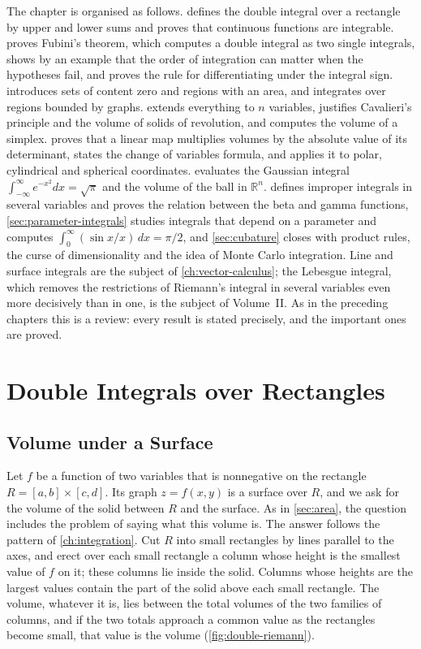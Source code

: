 The chapter is organised as follows.  defines the double integral over a rectangle by upper and lower sums and proves that continuous functions are integrable.  proves Fubini's theorem, which computes a double integral as two single integrals, shows by an example that the order of integration can matter when the hypotheses fail, and proves the rule for differentiating under the integral sign.  introduces sets of content zero and regions with an area, and integrates over regions bounded by graphs.  extends everything to $n$ variables, justifies Cavalieri's principle and the volume of solids of revolution, and computes the volume of a simplex.  proves that a linear map multiplies volumes by the absolute value of its determinant, states the change of variables formula, and applies it to polar, cylindrical and spherical coordinates.  evaluates the Gaussian integral $\int_{-\infty}^\infty e^{-x^2}dx=\sqrt\pi$ and the volume of the ball in $\mathbb R^n$.  defines improper integrals in several variables and proves the relation between the beta and gamma functions, \cref{sec:parameter-integrals} studies integrals that depend on a parameter and computes $\int_0^\infty(\sin x/x)\,dx=\pi/2$, and \cref{sec:cubature} closes with product rules, the curse of dimensionality and the idea of Monte Carlo integration. Line and surface integrals are the subject of \cref{ch:vector-calculus}; the Lebesgue integral, which removes the restrictions of Riemann's integral in several variables even more decisively than in one, is the subject of Volume~II. As in the preceding chapters this is a review: every result is stated precisely, and the important ones are proved.

\section{Double Integrals over Rectangles}
\label{sec:double-rectangles}

\subsection{Volume under a Surface}

Let $f$ be a function of two variables that is nonnegative on the rectangle $R=[a,b]\times[c,d]$. Its graph $z=f(x,y)$ is a surface over $R$, and we ask for the volume of the solid between $R$ and the surface. As in \cref{sec:area}, the question includes the problem of saying what this volume is. The answer follows the pattern of \cref{ch:integration}. Cut $R$ into small rectangles by lines parallel to the axes, and erect over each small rectangle a column whose height is the smallest value of $f$ on it; these columns lie inside the solid. Columns whose heights are the largest values contain the part of the solid above each small rectangle. The volume, whatever it is, lies between the total volumes of the two families of columns, and if the two totals approach a common value as the rectangles become small, that value is the volume (\cref{fig:double-riemann}).


